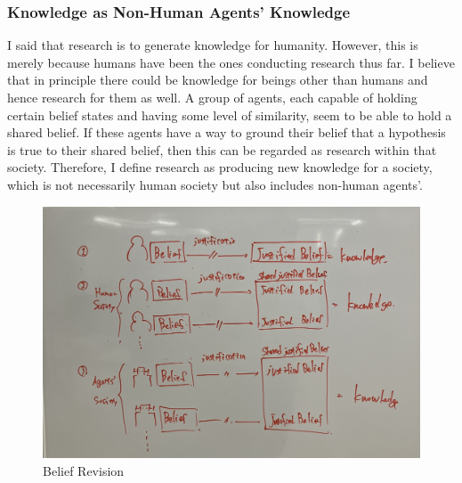 
\subsubsection{Knowledge as Non-Human Agents' Knowledge}
I said that research is to generate knowledge for humanity. However, this is merely because humans have been the ones conducting research thus far. I believe that in principle there could be knowledge for beings other than humans and hence research for them as well. A group of agents, each capable of holding certain belief states and having some level of similarity, seem to be able to hold a shared belief. If these agents have a way to ground their belief that a hypothesis is true to their shared belief, then this can be regarded as research within that society. Therefore, I define research as producing new knowledge for a society, which is not necessarily human society but also includes non-human agents'.

\begin{figure}[htb]
    \centering
    \includegraphics[width=\linewidth]{figs/shared_belief_revision.jpg}
    \caption{Belief Revision}
    \label{fig:shared_belief_revision}
\end{figure}

